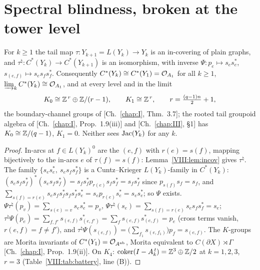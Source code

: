 \section{Spectral blindness, broken at the tower level}\label{VIII:sec:blind}

\begin{proposition}\label{VIII:prop:plain}
For $k\ge1$ the tail map $\tau\colon Y_{k+1}=L(Y_k)\to Y_k$ is an in-covering of plain
graphs, and $\tau^{\natural}\colon C^*(Y_k)\to C^*(Y_{k+1})$ is an isomorphism, with inverse
$\Psi\colon p_e\mapsto s_es_e^*$, $s_{(e,f)}\mapsto s_es_fs_f^*$. Consequently
$C^*(Y_k)\cong C^*(Y_1)=\mathcal{O}_{A_1}$ for all $k\ge1$, $\varinjlim_k C^*(Y_k)\cong\mathcal{O}_{A_1}$,
and at every level and in the limit
\[
K_0\cong\mathbb{Z}^{\,r}\oplus\mathbb{Z}/(r-1),\qquad K_1\cong\mathbb{Z}^{\,r},\qquad r=\tfrac{(q-1)n}{2}+1 ,
\]
the boundary-channel groups of {\rm[Ch.~\ref{chap:I}, Thm.~3.7]}; the rooted tail groupoid algebra of
{\rm[Ch.~\ref{chap:I}, Prop.~1.9(iii)]} and {\rm[Ch.~\ref{chap:III}, \S1]} has $K_0\cong\mathbb{Z}/(q-1)$, $K_1=0$. Neither sees
$\operatorname{Jac}(Y_k)$ for any $k$.
\end{proposition}

\begin{proof}
In-arcs at $f\in L(Y_k)^0$ are the $(e,f)$ with $r(e)=s(f)$, mapping bijectively to the
in-arcs $e$ of $\tau(f)=s(f)$: Lemma~\ref{VIII:lem:incov} gives $\tau^\natural$. The family
$\{s_es_e^*,\ s_es_fs_f^*\}$ is a Cuntz--Krieger $L(Y_k)$-family in $C^*(Y_k)$:
$(s_es_fs_f^*)^*(s_es_fs_f^*)=s_fs_f^*p_{r(e)}s_fs_f^*=s_fs_f^*$ since $p_{s(f)}s_f=s_f$,
and $\sum_{s(f)=r(e)}s_es_fs_f^*s_fs_f^*s_e^*=s_ep_{r(e)}s_e^*=s_es_e^*$; so $\Psi$ exists.
$\Psi\tau^\natural(p_v)=\sum_{s(e)=v}s_es_e^*=p_v$,
$\Psi\tau^\natural(s_e)=\sum_{s(f)=r(e)}s_es_fs_f^*=s_e$;
$\tau^\natural\Psi(p_e)=\sum_{f,f'}s_{(e,f)}s_{(e,f')}^*=\sum_fs_{(e,f)}s_{(e,f)}^*=p_e$
(cross terms vanish, $r(e,f)=f\ne f'$), and
$\tau^\natural\Psi(s_{(e,f)})=\bigl(\sum_{f_1}s_{(e,f_1)}\bigr)p_f=s_{(e,f)}$. The
$K$-groups are Morita invariants of $C^*(Y_1)=\mathcal{O}_{A^{\mathrm{nb}}}$, Morita equivalent to
$C(\partial X)\rtimes\Gamma$ [Ch.~\ref{chap:I}, Prop.~1.9(ii)]. On $K_4$: $\operatorname{coker}(I-A_k^{\,t})=\mathbb{Z}^3\oplus\mathbb{Z}/2$
at $k=1,2,3$, $r=3$ (Table~\ref{VIII:tab:battery}, line (B)).
\end{proof}

